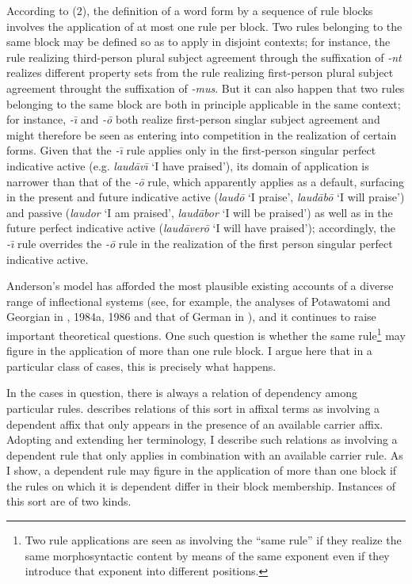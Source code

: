 \documentclass[output=paper,
modfonts
]{LSP/langsci}
\begin{document}
  According to (2), the definition of a word form by a sequence of rule blocks involves the application of at most one rule per block.  Two rules belonging to the same block may be defined so as to apply in disjoint contexts; for instance, the rule realizing third-person plural subject agreement through the suffixation of \textit{{}-nt} realizes different property sets from the rule realizing first-person plural subject agreement throught the suffixation of \textit{{}-mus}.  But it can also happen that two rules belonging to the same block are both in principle applicable in the same context; for instance, \textit{{}-\=\i} and \textit{{}-\=o} both realize first-person singlar subject agreement and might therefore be seen as entering into competition in the realization of certain forms.  Given that the \textit{{}-\=\i} rule\textit{} applies only in the first-person singular perfect indicative active (e.g.\textit{} \textit{laud\=av\=\i} ‘I have praised’), its domain of application is narrower than that of the \textit{{}-\=o} rule, which apparently applies as a default, surfacing in the present and future indicative active (\textit{laud\=o} ‘I praise’, \textit{laud\=ab\=o} ‘I will praise’) and passive (\textit{laudor} ‘I am praised’, \textit{laud\=abor} ‘I will be praised’) as well as in the future perfect indicative active (\textit{laud\=aver\=o} ‘I will have praised’); accordingly, the \textit{{}-\=\i} rule overrides the \textit{{}-\=o} rule in the realization of the first person singular perfect indicative active.

Anderson’s model has afforded the most plausible existing accounts of a diverse range of inflectional systems (see, for example, the analyses of Potawatomi and Georgian in \citealt{Anderson1977a}, 1984a, 1986 and that of German in \citealt{Zwicky1985a}), and it continues to raise important theoretical questions. One such question is whether the same rule\footnote{Two rule applications are seen as involving the “same rule” if they realize the same morphosyntactic content by means of the same exponent even if they introduce that exponent into different positions.} may figure in the application of more than one rule block.  I argue here that in a particular class of cases, this is precisely what happens.  

In the cases in question, there is always a relation of dependency among particular rules.  \citet{Harris2017} describes relations of this sort in affixal terms as involving a dependent affix that only appears in the presence of an available carrier affix.  Adopting and extending her terminology, I describe such relations as involving a dependent rule that only applies in combination with an available carrier rule.  As I show, a dependent rule may figure in the application of more than one block if the rules on which it is dependent differ in their block membership.  Instances of this sort are of two kinds.
\end{document}
